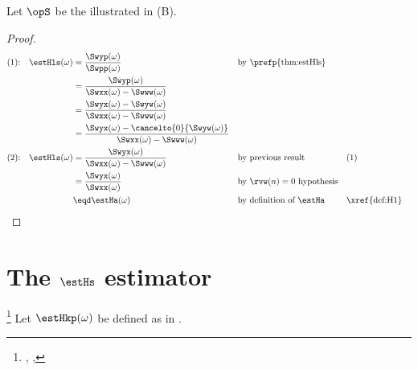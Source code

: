 \begin{corollary}
\label{cor:H1LSb}
Let $\opS$ be the  illustrated in  (B).
\end{corollary}
\begin{proof}
  \begin{align*}
    \text{(1):\quad}\estHls(\omega)
      &= \frac{\Swyp(\omega)}{\Swpp(\omega)}
      && \text{by \prefp{thm:estHls}}
    \\&= \frac{\Swyp(\omega)}{\Swxx(\omega)-\Swww(\omega)}
    \\&= \frac{\Swyx(\omega)-\Swyw(\omega)}{\Swxx(\omega)-\Swww(\omega)}
    \\&= \frac{\Swyx(\omega)-\cancelto{0}{\Swyw(\omega)}}{\Swxx(\omega)-\Swww(\omega)}
    \\
    \text{(2):\quad}\estHls(\omega)
      &= \frac{\Swyx(\omega)}{\Swxx(\omega)-\Swww(\omega)}
      && \text{by previous result}
      && \text{(1)}
    \\&= \frac{\Swyx(\omega)}{\Swxx(\omega)}
      && \text{by $\rvw(n)=0$ hypothesis}
    \\&\eqd \estHa(\omega)
      && \text{by definition of $\estHa$}
      && \text{\xref{def:H1}}
  \end{align*}
\end{proof}

\section{The $\estHs$ estimator}
\begin{proposition}
\footnote{
  ,
  ,
  }
\label{prop:Hkappa}
Let $\estHkp(\omega)$ be defined as in .
\end{proposition}


